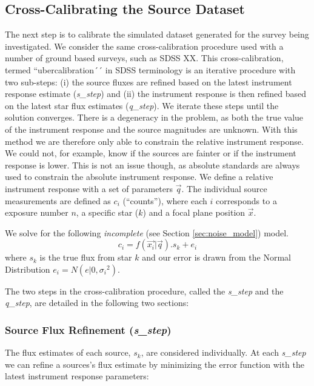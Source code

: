 \documentclass[manuscript]{aastex}
\begin{document}
\subsection{Cross-Calibrating the Source Dataset}
The next step is to calibrate the simulated dataset generated for the survey being investigated. We consider the same cross-calibration procedure used with a number of ground based surveys, such as SDSS XX. This cross-calibration, termed ``ubercalibration´´ in SDSS terminology is an iterative procedure with two sub-steps: (i) the source fluxes are refined based on the latest instrument response estimate (\textit{s\_step}) and (ii) the instrument response is then refined based on the latest star flux estimates (\textit{q\_step}). We iterate these steps until the solution converges. There is a degeneracy in the problem, as both the true value of the instrument response and the source magnitudes are unknown. With this method we are therefore only able to constrain the relative instrument response. We could not, for example, know if the sources are fainter or if the instrument response is lower. This is not an issue though, as absolute standards are always used to constrain the absolute instrument response. We define a relative instrument response with a set of parameters $\vec{q}$. The individual source measurements are defined as $c_i$ (``counts''), where each $i$ corresponds to a exposure number $n$, a specific star ($k$) and a focal plane position $\vec{x}$.

\noindent{}We solve for the following \textit{incomplete} (see Section \ref{sec:noise_model}) model.
\begin{displaymath}
c_i = f(\vec{x_i} | \vec{q}) . s_{k} + e_{i}
\end{displaymath}
where $s_k$ is the true flux from star $k$ and our error is drawn from the Normal Distribution $e_{i} = N(e|0,{\sigma_i}^2)$.

\noindent{}The two steps in the cross-calibration procedure, called the \textit{s\_step} and the \textit{q\_step}, are detailed in the following two sections:

\subsubsection{Source Flux Refinement (\textit{s\_step})}
The flux estimates of each source, $s_k$, are considered individually. At each \textit{s\_step} we can refine a sources's flux estimate by minimizing the error function with the latest instrument response parameters:
\end{document}
